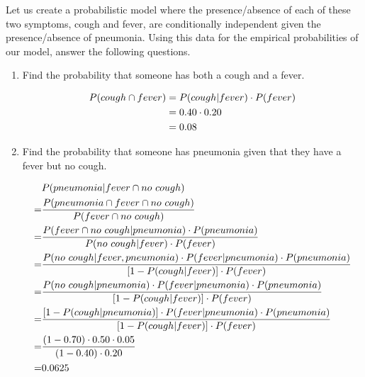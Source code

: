 \documentclass[11pt]{article}
\begin{document}
Let us create a probabilistic model where the presence/absence of each of these two symptoms, cough and fever, are conditionally independent given the presence/absence of pneumonia. Using this data for the empirical probabilities of our model, answer the following questions.
\begin{enumerate}
\item Find the probability that someone has both a cough and a fever. \\
\begin{answertext}{3cm}{}
\begin{align}
P(cough \cap fever) &= P(cough | fever) \cdot P(fever) \notag \\
&= 0.40 \cdot 0.20 \notag \\
&= 0.08 \notag
\end{align}
\end{answertext} 
\item Find the probability that someone has pneumonia given that they have a fever but no cough. \\
\begin{answertext}{9cm}{}
\begin{align}
&P(pneumonia | fever \cap no \ cough) \notag\\
=& \frac{P(pneumonia \cap fever \cap no \ cough)}{P(fever \cap no \ cough)} \notag\\
=& \frac{P(fever \cap no \ cough | pneumonia) \cdot P(pneumonia)}{P(no \ cough | fever) \cdot P(fever)} \notag\\
=& \frac{P(no \ cough | fever, pneumonia) \cdot P(fever | pneumonia) \cdot P(pneumonia)}{[1-P(cough | fever)] \cdot P(fever)} \notag\\
=& \frac{P(no \ cough | pneumonia) \cdot P(fever | pneumonia) \cdot P(pneumonia)}{[1-P(cough | fever)] \cdot P(fever)} \notag\\
=& \frac{[1-P(cough | pneumonia)] \cdot P(fever | pneumonia) \cdot P(pneumonia)}{[1-P(cough | fever)] \cdot P(fever)} \notag\\
=& \frac{(1-0.70) \cdot 0.50 \cdot 0.05}{(1-0.40) \cdot 0.20} \notag\\
=& 0.0625 \notag
\end{align}
\end{answertext} 

\newpage


\end{enumerate}
\end{document}

